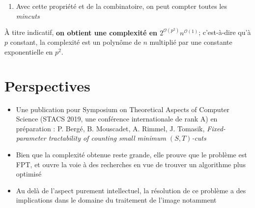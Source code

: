 \documentclass[a0,portrait]{a0poster}
\begin{document}
\begin{multicols}{2}
\begin{enumerate}
  \item Avec cette propriété et de la combinatoire, on peut compter toutes les \textit{mincuts}
\end{enumerate}


À titre indicatif, \textbf{on obtient une complexité en $2^{\mathcal{O}(p^2)}n^{\mathcal{O}(1)}$}; c'est-à-dire qu'à $p$ constant, la complexité est un polynôme de $n$ multiplié par une constante exponentielle en $p^2$.


\color{NavyBlue} 

\section*{Perspectives}

\begin{itemize}
  \item \color{Red} Une publication pour Symposium on Theoretical Aspects of Computer Science (STACS 2019, une conférence internationale de rank A) en préparation : P. Bergé, B. Mouscadet, A. Rimmel, J. Tomasik, \textit{Fixed-parameter tractability of counting small minimum $(S,T)$-cuts}
  \color{NavyBlue} 
  \item Bien que la complexité obtenue reste grande, elle prouve que le problème est FPT, et ouvre la voie à des recherches en vue de trouver un algorithme plus optimisé 
  \item Au delà de l'aspect purement intellectuel, la résolution de ce problème a des implications dans le domaine du traitement de l'image notamment
\end{itemize}
\color{Black}
\end{multicols}
\end{document}
